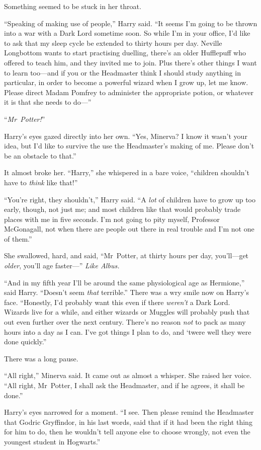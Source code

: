 Something seemed to be stuck in her throat.

“Speaking of making use of people,” Harry said. “It seems I’m going to be thrown into a war with a Dark Lord sometime soon. So while I’m in your office, I’d like to ask that my sleep cycle be extended to thirty hours per day. Neville Longbottom wants to start practising duelling, there’s an older Hufflepuff who offered to teach him, and they invited me to join. Plus there’s other things I want to learn too—and if you or the Headmaster think I should study anything in particular, in order to become a powerful wizard when I grow up, let me know. Please direct Madam Pomfrey to administer the appropriate potion, or whatever it is that she needs to do—”

“\emph{Mr~Potter!}”

Harry’s eyes gazed directly into her own. “Yes, Minerva? I know it wasn’t your idea, but I’d like to survive the use the Headmaster’s making of me. Please don’t be an obstacle to that.”

It almost broke her. “Harry,” she whispered in a bare voice, “children shouldn’t have to \emph{think} like that!”

“You’re right, they shouldn’t,” Harry said. “A \emph{lot} of children have to grow up too early, though, not just me; and most children like that would probably trade places with me in five seconds. I’m not going to pity myself, Professor McGonagall, not when there are people out there in real trouble and I’m not one of them.”

She swallowed, hard, and said, “Mr~Potter, at thirty hours per day, you’ll—get \emph{older}, you’ll age faster—” \emph{Like Albus.}

“And in my fifth year I’ll be around the same physiological age as Hermione,” said Harry. “Doesn’t seem \emph{that} terrible.” There was a wry smile now on Harry’s face. “Honestly, I’d probably want this even if there \emph{weren’t} a Dark Lord. Wizards live for a while, and either wizards or Muggles will probably push that out even further over the next century. There’s no reason \emph{not} to pack as many hours into a day as I can. I’ve got things I plan to do, and ‘twere well they were done quickly.”

There was a long pause.

“All right,” Minerva said. It came out as almost a whisper. She raised her voice. “All right, Mr~Potter, I shall ask the Headmaster, and if he agrees, it shall be done.”

Harry’s eyes narrowed for a moment. “I see. Then please remind the Headmaster that Godric Gryffindor, in his last words, said that if it had been the right thing for him to do, then he wouldn’t tell anyone else to choose wrongly, not even the youngest student in Hogwarts.”

